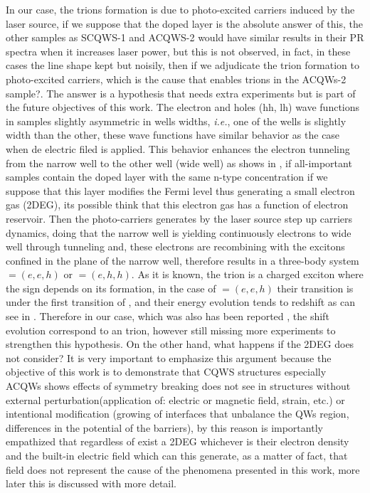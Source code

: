 In our case, the trions formation is due to photo-excited carriers induced by the laser source, if we suppose that the doped layer is the absolute answer of this, the other samples as SCQWS-1 and ACQWS-2 would have similar results in their PR spectra when it increases laser power, but this is not observed, in fact, in these cases the line shape kept but noisily, then if we adjudicate the trion formation to photo-excited carriers, which is the cause that enables trions in the ACQWs-2 sample?. The answer is a hypothesis that needs extra experiments but is part of the future objectives of this work. The electron and holes (hh, lh) wave functions in samples slightly asymmetric in wells widths, \textit{i.e.}, one of the wells is slightly width than the other, these wave functions have similar behavior as the case when de electric filed is applied. This behavior enhances the electron tunneling from the narrow well to the other well (wide well) as shows in , if all-important samples contain the doped layer with the same n-type concentration if we suppose that this layer modifies the Fermi level thus generating a small electron gas (2DEG), its possible think that this electron gas has a function of electron reservoir\cite{manassen1996exciton,finkelstein1996negatively}.  Then the photo-carriers generates by the laser source step up carriers dynamics, doing that the narrow well is yielding continuously electrons to wide well through tunneling and, these electrons are recombining with the excitons confined in the plane of the narrow well, therefore results in a three-body system  \xm$=(e,e,h)$ or  \xp$=(e,h,h)$. As it is known, the trion is a charged exciton where the sign depends on its formation, in the case of \xm$=(e,e,h)$  their transition is under the first transition of \xhh, and their energy evolution tends to redshift as can see in . Therefore in our case, which was also has been reported 
\cite{sibeldin2001formation,israel2005trions,manassen1996exciton,kheng1993observation,finkelstein1996negatively}, the shift evolution correspond to an \xm trion, however still missing more experiments to strengthen this hypothesis. On the other hand, what happens if the 2DEG does not consider? 
It is very important to emphasize this argument because the objective of this work is to demonstrate that CQWS structures especially ACQWs shows effects of symmetry breaking does not see in structures without external perturbation(application of:  electric or magnetic field,  strain, etc.) or intentional modification (growing of interfaces that unbalance the QWs region, differences in the potential of the barriers), by this reason is importantly empathized that regardless of exist a 2DEG whichever is their electron density and the built-in electric field which can this generate, as a matter of fact,  that field does not represent the cause of the phenomena presented in this work, more later this is discussed with more detail. 
